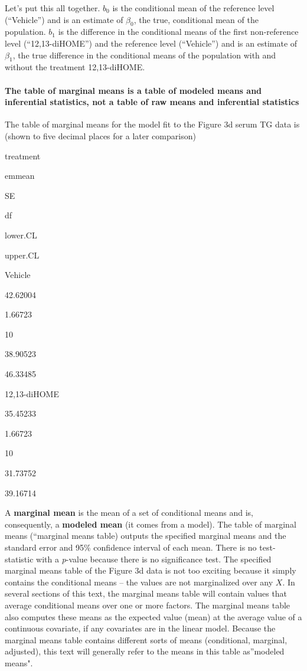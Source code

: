 \documentclass[]{book}
\let\oldparagraph\paragraph
\renewcommand{\paragraph}[1]{\oldparagraph{#1}\mbox{}}
\begin{document}
Let's put this all together. \(b_0\) is the conditional mean of the reference level (``Vehicle'') and is an estimate of \(\beta_0\), the true, conditional mean of the population. \(b_1\) is the difference in the conditional means of the first non-reference level (``12,13-diHOME'') and the reference level (``Vehicle'') and is an estimate of \(\beta_1\), the true difference in the conditional means of the population with and without the treatment 12,13-diHOME.

\hypertarget{the-table-of-marginal-means-is-a-table-of-modeled-means-and-inferential-statistics-not-a-table-of-raw-means-and-inferential-statistics}{%
\paragraph{The table of marginal means is a table of modeled means and inferential statistics, not a table of raw means and inferential statistics}\label{the-table-of-marginal-means-is-a-table-of-modeled-means-and-inferential-statistics-not-a-table-of-raw-means-and-inferential-statistics}}

The table of marginal means for the model fit to the Figure 3d serum TG data is (shown to five decimal places for a later comparison)

treatment

emmean

SE

df

lower.CL

upper.CL

Vehicle

42.62004

1.66723

10

38.90523

46.33485

12,13-diHOME

35.45233

1.66723

10

31.73752

39.16714

A \textbf{marginal mean} is the mean of a set of conditional means and is, consequently, a \textbf{modeled mean} (it comes from a model). The table of marginal means (``marginal means table) outputs the specified marginal means and the standard error and 95\% confidence interval of each mean. There is no test-statistic with a \emph{p}-value because there is no significance test. The specified marginal means table of the Figure 3d data is not too exciting because it simply contains the conditional means -- the values are not marginalized over any \(X\). In several sections of this text, the marginal means table will contain values that average conditional means over one or more factors. The marginal means table also computes these means as the expected value (mean) at the average value of a continuous covariate, if any covariates are in the linear model. Because the marginal means table contains different sorts of means (conditional, marginal, adjusted), this text will generally refer to the means in this table as''modeled means".
\end{document}
